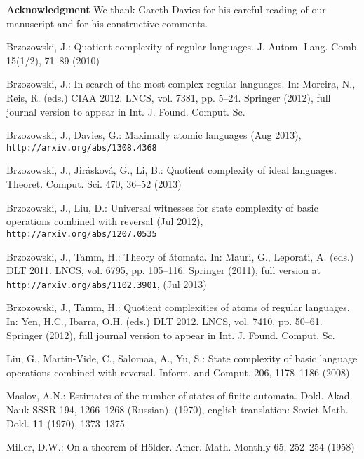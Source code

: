 \documentclass{llncs}
\newcommand{\noin}{\noindent}
\begin{document}
\noin
{\bf Acknowledgment}
We thank Gareth Davies for his careful reading of our manu\-script and for his constructive comments.


\providecommand{\noopsort}[1]{}
\begin{thebibliography}{10}
\providecommand{\url}[1]{\texttt{#1}}
\providecommand{\urlprefix}{URL }

Brzozowski, J.: Quotient complexity of regular languages. J. Autom. Lang. Comb.
   15(1/2),  71--89 (2010)

Brzozowski, J.: In search of the most complex regular languages. In: Moreira,
  N., Reis, R. (eds.) CIAA 2012. LNCS, vol. 7381, pp. 5--24. Springer (2012),
  full journal version to appear in Int. J. Found. Comput. Sc.

Brzozowski, J., Davies, G.: Maximally atomic languages (Aug 2013), {\small\tt
  http://arxiv.org/abs/1308.4368}

Brzozowski, J., Jir{\'a}skov{\'a}, G., Li, B.: Quotient complexity of ideal
  languages. Theoret. Comput. Sci.  470,  36--52 (2013)

Brzozowski, J., Liu, D.: Universal witnesses for state complexity of basic
  operations combined with reversal (Jul 2012), {\small\tt
  http://arxiv.org/abs/1207.0535}

Brzozowski, J., Tamm, H.: Theory of \'atomata. In: Mauri, G., Leporati, A.
  (eds.) DLT 2011. LNCS, vol. 6795, pp. 105--116. Springer (2011), full version
  at {\small\tt http://arxiv.org/abs/1102.3901}, (Jul 2013)

Brzozowski, J., Tamm, H.: Quotient complexities of atoms of regular languages.
  In: Yen, H.C., Ibarra, O.H. (eds.) DLT 2012. LNCS, vol. 7410, pp. 50--61.
  Springer (2012), full journal version to appear in Int. J. Found. Comput. Sc.

Liu, G., Martin-Vide, C., Salomaa, A., Yu, S.: State complexity of basic
  language operations combined with reversal. Inform. and Comput.  206,
  1178--1186 (2008)

Maslov, A.N.: Estimates of the number of states of finite automata. Dokl. Akad.
  Nauk SSSR  194,  1266--1268 (Russian). (1970), english translation: Soviet
  Math. Dokl. {\bf 11} (1970), 1373--1375

Miller, D.W.: On a theorem of {H}\"older. Amer. Math. Monthly  65,  252--254
  (1958)


\end{thebibliography}
\end{document}
